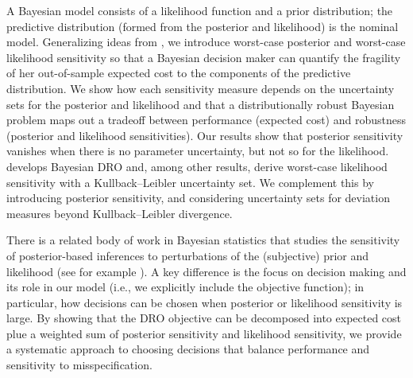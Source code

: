 \documentclass[11pt,reqno,letter]{amsart}
\theoremstyle{plain}
\theoremstyle{definition}
\numberwithin{equation}{section}
\numberwithin{theorem}{section}
\numberwithin{table}{section}
\numberwithin{figure}{section}
\begin{document}
A Bayesian model consists of a likelihood function and a prior distribution; the predictive distribution (formed from the posterior and likelihood) is the nominal model. Generalizing ideas from \cite{gotoh2026sensitivity}, we introduce worst-case posterior and worst-case likelihood sensitivity so that a Bayesian decision maker can quantify the fragility of her out-of-sample expected cost to the components of the predictive distribution. We show how each sensitivity measure depends on the uncertainty sets for the posterior and likelihood and that a distributionally robust Bayesian problem maps out a tradeoff between performance (expected cost) and robustness (posterior and likelihood sensitivities). Our results show that posterior sensitivity vanishes when there is no parameter uncertainty, but not so for the likelihood. \cite{shapiro2023bayesian} develops Bayesian DRO and, among other results, derive worst-case likelihood sensitivity  with a Kullback--Leibler uncertainty set. %
We complement this by introducing posterior sensitivity, and considering uncertainty sets for deviation measures beyond Kullback--Leibler divergence.

There is a related body of work in Bayesian statistics that studies the sensitivity of posterior-based inferences  to perturbations of the (subjective) prior and  likelihood (see for example \cite{berger1986Bayesian,gustafson1985Bayesian,Lavine1991Bayesian}). A key difference is the focus on decision making and its role in our model (i.e., we explicitly include the objective function); in particular, how decisions can be chosen when posterior or likelihood sensitivity is large. By showing that the DRO objective can be decomposed into  expected cost plue a weighted sum of posterior sensitivity and likelihood sensitivity, we provide a systematic approach to choosing decisions that balance  performance and sensitivity to misspecification.






\end{document}

